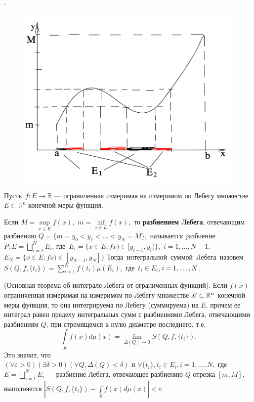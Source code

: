 .
\begin{figure}
	\includegraphics[width=\linewidth]{images/1.png}
\end{figure}
\begin{Def}
	\mbox{Пусть $ f:E\to\mathbb{R} $} ---  ограниченная измеримая на измеримом по Лебегу множестве \mbox{$ E\subset\mathbb{R}^n $} конечной меры функция.

	Если $ M=\sup\limits_{x\in E}f(x), $ $ m=\inf\limits_{x\in E}f(x), $ то \textbf{разбиением Лебега}, отвечающим разбиению $ Q=\{m=y_0<y_1<\ldots <y_N=M\}, $ называется разбиение
	$ P: E=\bigsqcup\limits_{i=1}^{N}E_i$, \mbox{где $E_i=\{x\in E: fx)\in [y_{i-1}, y_i)\},$} $i=1, \ldots, N-1$.
	\newline
	$E_N= \{x\in E: fx)\in [y_{N-1}, y_N]\}$
	\newline
	\newline
	\mbox{Тогда интегральной суммой Лебега назовем $S(Q, f, \{t_i\})=\sum\limits_{i=1}^N f(t_i)\mu(E_i)$, где $t_i \in E_i,$}$ 
	\newline i = 1, \ldots, N$.
\end{Def} 
\begin{theorem}(Основная теорема об интеграле Лебега от ограниченных функций).
	Если $f(x)$ ограниченная измеримая на измеримом по Лебегу множестве $ E\subset\R^n $ конечной меры  функция, то она интегрируема по Лебегу (суммируема) на $E$, причем ее интеграл равен пределу интегральных сумм с разбиениями Лебега, отвечающими разбиениям  $ Q $, при стремящемся к нулю диаметре последнего, т.е. $$\int\limits_E f(x)d\mu(x)=\lim_{\Delta(Q)\to 0}S(Q,f,\{t_i\}).$$
	Это значит, что $(\forall \varepsilon >0)(\exists \delta > 0)(\forall Q, \Delta(Q)<\delta) \text{ и } \forall \{t_i\}, t_i \in E_i, i=1,\ldots, N,$ где $E=\bigsqcup\limits_{i=1}^N E_i$ --- разбиение Лебега, отвечающее разбиению $Q$ отрезка $[m, M]$, выполняется $|S(Q, f, \{t_i\})-\int\limits_E f(x)d\mu(x)|<\varepsilon$.
\end{theorem}

